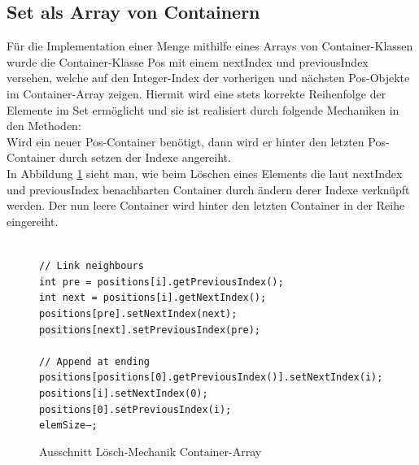 \documentclass[11pt]{scrartcl}
\begin{document}
\subsection{Set als Array von Containern}
\label{sec:setConArray}

Für die Implementation einer Menge mithilfe eines Arrays von Container-Klassen wurde die Container-Klasse Pos mit einem nextIndex und previousIndex versehen, 
welche auf den Integer-Index der vorherigen und nächsten Pos-Objekte im Container-Array zeigen. 
Hiermit wird eine stets korrekte Reihenfolge der Elemente im Set ermöglicht und sie ist realisiert durch folgende Mechaniken in den Methoden:\\
Wird ein neuer Pos-Container benötigt, dann wird er hinter den letzten Pos-Container durch setzen der Indexe angereiht.\\
In Abbildung \ref{figure:delmech} sieht man, wie beim Löschen eines Elements die laut nextIndex und previousIndex benachbarten Container durch ändern derer Indexe verknüpft werden. Der nun leere Container wird hinter den letzten Container in der Reihe eingereiht.
\begin{figure}[h!]
\texttt{ \\
// Link neighbours\\
int pre = positions[i].getPreviousIndex();\\
int next = positions[i].getNextIndex();\\
positions[pre].setNextIndex(next);\\
positions[next].setPreviousIndex(pre);\\
\\
// Append at ending\\
positions[positions[0].getPreviousIndex()].setNextIndex(i);\\
positions[i].setNextIndex(0);\\
positions[0].setPreviousIndex(i);\\
elemSize--;\\
}
\caption{Ausschnitt Lösch-Mechanik Container-Array}
\label{figure:delmech}
\end{figure}
\end{document}
